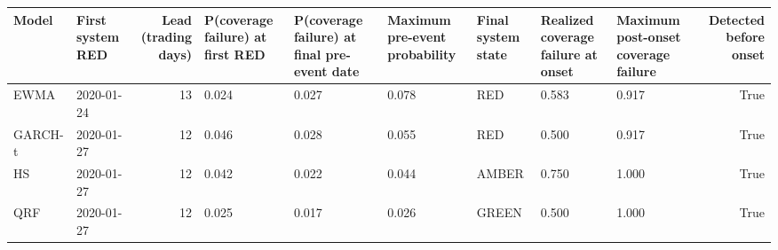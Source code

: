 \begin{tabular}{llrllllllr}
\toprule
Model & First system RED & Lead (trading days) & P(coverage failure) at first RED & P(coverage failure) at final pre-event date & Maximum pre-event probability & Final system state & Realized coverage failure at onset & Maximum post-onset coverage failure & Detected before onset \\
\midrule
EWMA & 2020-01-24 & 13 & 0.024 & 0.027 & 0.078 & RED & 0.583 & 0.917 & True \\
GARCH-t & 2020-01-27 & 12 & 0.046 & 0.028 & 0.055 & RED & 0.500 & 0.917 & True \\
HS & 2020-01-27 & 12 & 0.042 & 0.022 & 0.044 & AMBER & 0.750 & 1.000 & True \\
QRF & 2020-01-27 & 12 & 0.025 & 0.017 & 0.026 & GREEN & 0.500 & 1.000 & True \\
\bottomrule
\end{tabular}
